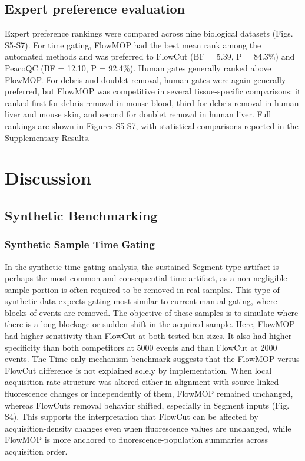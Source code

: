 \documentclass[ASNA]{latex/wiley/USG}
\begin{document}
\subsection{Expert preference
evaluation}\label{expert-preference-evaluation}

Expert preference rankings were compared across nine biological datasets
(Figs. S5-S7). For time gating, FlowMOP had the best mean rank among the
automated methods and was preferred to FlowCut (BF = 5.39, P = 84.3\%)
and PeacoQC (BF = 12.10, P = 92.4\%). Human gates generally ranked above
FlowMOP. For debris and doublet removal, human gates were again
generally preferred, but FlowMOP was competitive in several
tissue-specific comparisons: it ranked first for debris removal in mouse
blood, third for debris removal in human liver and mouse skin, and
second for doublet removal in human liver. Full rankings are shown in
Figures S5-S7, with statistical comparisons reported in the
Supplementary Results.

\FloatBarrier

\section{Discussion}\label{discussion}

\subsection{Synthetic Benchmarking}\label{synthetic-benchmarking}

\subsubsection{Synthetic Sample Time
Gating}\label{synthetic-sample-time-gating}

In the synthetic time-gating analysis, the sustained Segment-type
artifact is perhaps the most common and consequential time artifact, as
a non-negligible sample portion is often required to be removed in real
samples. This type of synthetic data expects gating most similar to
current manual gating, where blocks of events are removed. The objective
of these samples is to simulate where there is a long blockage or sudden
shift in the acquired sample. Here, FlowMOP had higher sensitivity than
FlowCut at both tested bin sizes. It also had higher specificity than
both competitors at 5000 events and than FlowCut at 2000 events. The
Time-only mechanism benchmark suggests that the FlowMOP versus FlowCut
difference is not explained solely by implementation. When local
acquisition-rate structure was altered either in alignment with
source-linked fluorescence changes or independently of them, FlowMOP
remained unchanged, whereas FlowCut\textquotesingle s removal behavior
shifted, especially in Segment inputs (Fig. S4). This supports the
interpretation that FlowCut can be affected by acquisition-density
changes even when fluorescence values are unchanged, while FlowMOP is
more anchored to fluorescence-population summaries across acquisition
order.
\end{document}
